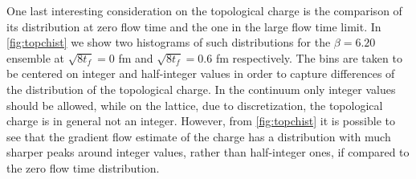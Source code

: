 One last interesting consideration on the topological charge is the comparison of its distribution at zero flow time and the one in the large flow time limit. In \cref{fig:topchist} we show two histograms of such distributions for the $\beta = 6.20$ ensemble at $\sqrt{8t_f} = 0$ fm and $\sqrt{8t_f} = 0.6$ fm respectively. The bins are taken to be centered on integer and half-integer values in order to capture differences of the distribution of the topological charge. In the continuum only integer values should be allowed, while on the lattice, due to discretization, the topological charge is in general not an integer. However, from \cref{fig:topchist} it is possible to see that the gradient flow estimate of the charge has a distribution with much sharper peaks around integer values, rather than half-integer ones, if compared to the zero flow time distribution. 
